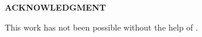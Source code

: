 \thispagestyle{empty}
    \vspace*{1em}
    \vspace*{1em}
    
    \begin{center}
        \textbf{\large{ACKNOWLEDGMENT}}
    \end{center}
    \vspace*{1em}
    \vspace*{1em}
    \setlength{\parindent}{0em}
    This work has not been possible without the help of \lipsum[4]. 
    
\newpage




